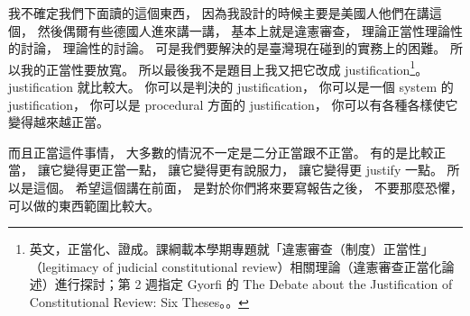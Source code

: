 \hypertarget{w01:cue:1234}{}我不確定我們下面讀的這個東西，
\hypertarget{w01:cue:1235}{}因為我設計的時候主要是美國人他們在講這個，
\hypertarget{w01:cue:1236}{}然後偶爾有些德國人進來講一講，
\hypertarget{w01:cue:1237}{}基本上就是違憲審查，
\hypertarget{w01:cue:1238}{}理論正當性理論性的討論，
\hypertarget{w01:cue:1239}{}理論性的討論。
\hypertarget{w01:cue:1240}{}可是我們要解決的是臺灣現在碰到的實務上的困難。
\hypertarget{w01:cue:1241}{}所以我的正當性要放寬。
\hypertarget{w01:cue:1242}{}所以最後我不是題目上我又把它改成 justification\footnote{英文，正當化、證成。課綱載本學期專題就「違憲審查（制度）正當性」（legitimacy of judicial constitutional review）相關理論（違憲審查正當化論述）進行探討；第 2 週指定 Gyorfi 的 The Debate about the Justification of Constitutional Review: Six Theses。\cite{gyorfi2016}。}。
\hypertarget{w01:cue:1243}{}justification 就比較大。
\hypertarget{w01:cue:1244}{}你可以是判決的 justification，
\hypertarget{w01:cue:1245}{}你可以是一個 system 的 justification，
\hypertarget{w01:cue:1246}{}你可以是 procedural 方面的 justification，
\hypertarget{w01:cue:1247}{}你可以有各種各樣使它變得越來越正當。

\hypertarget{w01:cue:1248}{}而且正當這件事情，
\hypertarget{w01:cue:1249}{}大多數的情況不一定是二分正當跟不正當。
\hypertarget{w01:cue:1250}{}有的是比較正當，
\hypertarget{w01:cue:1251}{}讓它變得更正當一點，
\hypertarget{w01:cue:1252}{}讓它變得更有說服力，
\hypertarget{w01:cue:1253}{}讓它變得更 justify 一點。
\hypertarget{w01:cue:1254}{}所以是這個。
\hypertarget{w01:cue:1255}{}希望這個講在前面，
\hypertarget{w01:cue:1256}{}是對於你們將來要寫報告之後，
\hypertarget{w01:cue:1257}{}不要那麼恐懼，
\hypertarget{w01:cue:1258}{}可以做的東西範圍比較大。

